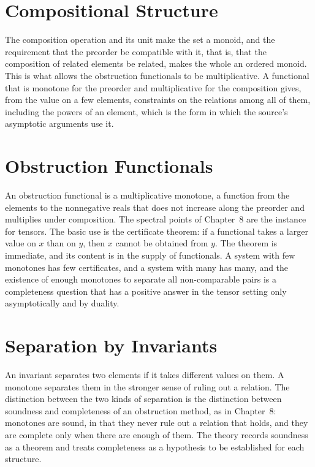 \documentclass[11pt,letterpaper]{report}
\theoremstyle{plain}
\theoremstyle{definition}
\theoremstyle{remark}
\begin{document}
\section{Compositional Structure}

The composition operation and its unit make the set a monoid, and the requirement that the preorder be compatible with it, that is, that the composition of related elements be related, makes the whole an ordered monoid. This is what allows the obstruction functionals to be multiplicative. A functional that is monotone for the preorder and multiplicative for the composition gives, from the value on a few elements, constraints on the relations among all of them, including the powers of an element, which is the form in which the source's asymptotic arguments use it.

\section{Obstruction Functionals}

An obstruction functional is a multiplicative monotone, a function from the elements to the nonnegative reals that does not increase along the preorder and multiplies under composition. The spectral points of Chapter~8 are the instance for tensors. The basic use is the certificate theorem: if a functional takes a larger value on $x$ than on $y$, then $x$ cannot be obtained from $y$. The theorem is immediate, and its content is in the supply of functionals. A system with few monotones has few certificates, and a system with many has many, and the existence of enough monotones to separate all non-comparable pairs is a completeness question that has a positive answer in the tensor setting only asymptotically and by duality.

\section{Separation by Invariants}

An invariant separates two elements if it takes different values on them. A monotone separates them in the stronger sense of ruling out a relation. The distinction between the two kinds of separation is the distinction between soundness and completeness of an obstruction method, as in Chapter~8: monotones are sound, in that they never rule out a relation that holds, and they are complete only when there are enough of them. The theory records soundness as a theorem and treats completeness as a hypothesis to be established for each structure.
\end{document}
